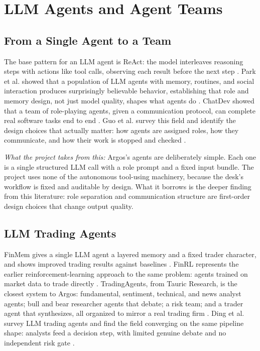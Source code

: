 \documentclass[conference]{IEEEtran}
\newcommand{\sys}{Argos}
\begin{document}
\section{LLM Agents and Agent Teams}
\label{sec:agents}

\subsection{From a Single Agent to a Team}

The base pattern for an LLM agent is ReAct: the model interleaves reasoning steps with actions like tool calls, observing each result before the next step \cite{yao2022react}. Park et al. showed that a population of LLM agents with memory, routines, and social interaction produces surprisingly believable behavior, establishing that role and memory design, not just model quality, shapes what agents do \cite{park2023generative}. ChatDev showed that a team of role-playing agents, given a communication protocol, can complete real software tasks end to end \cite{qian2023chatdev}. Guo et al. survey this field and identify the design choices that actually matter: how agents are assigned roles, how they communicate, and how their work is stopped and checked \cite{guo2024llmmultiagents}.

\emph{What the project takes from this:} \sys{}'s agents are deliberately simple. Each one is a single structured LLM call with a role prompt and a fixed input bundle. The project uses none of the autonomous tool-using machinery, because the desk's workflow is fixed and auditable by design. What it borrows is the deeper finding from this literature: role separation and communication structure are first-order design choices that change output quality.

\subsection{LLM Trading Agents}

FinMem gives a single LLM agent a layered memory and a fixed trader character, and shows improved trading results against baselines \cite{yu2023finmem}. FinRL represents the earlier reinforcement-learning approach to the same problem: agents trained on market data to trade directly \cite{liu2023finrl}. TradingAgents, from Tauric Research, is the closest system to \sys{}: fundamental, sentiment, technical, and news analyst agents; bull and bear researcher agents that debate; a risk team; and a trader agent that synthesizes, all organized to mirror a real trading firm \cite{xiao2024tradingagents}. Ding et al. survey LLM trading agents and find the field converging on the same pipeline shape: analysts feed a decision step, with limited genuine debate and no independent risk gate \cite{ding2024llmtrading}.
\end{document}
